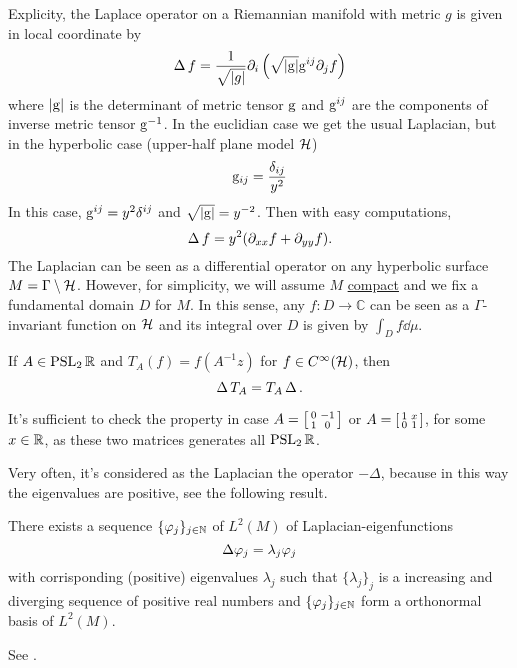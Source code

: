 Explicity, the Laplace operator on a Riemannian manifold with metric $g$ is given in local coordinate by
\[
\operatorname{\Delta} f = \frac{1}{\sqrt{\left| g\right|}}\partial_{i}\left(\sqrt{\left| \mathrm{g}\right|}\mathrm{g}^{ij}\partial_{j}f\right)
\]
where $\left| \mathrm{g}\right|$ is the determinant of metric tensor $\mathrm{g}$ and $\mathrm{g}^{ij}$ are the components of inverse metric tensor $\mathrm{g}^{-1}$. In the euclidian case we get the usual Laplacian, but in the hyperbolic case (upper-half plane model $\mathcal{H}$)
\[
\mathrm{g}_{ij}=\frac{\delta_{ij}}{y^{2}}
\]
In this case, $\mathrm{g}^{ij}=y^{2}\delta^{ij}$ and $\sqrt{\left| \mathrm{g}\right|}=y^{-2}$. Then with easy computations,
\[
\operatorname{\Delta} f=y^{2}(\partial_{xx}f+\partial_{yy}f).
\]
The Laplacian can be seen as a differential operator on any hyperbolic surface $M=\Gamma\setminus\mathcal{H}$. However, for simplicity, we will assume $M$ \underline{compact} and we fix a fundamental domain $D$ for $M$. In this sense, any $f\colon D\to\mathbb{C}$ can be seen as a $\Gamma$-invariant function on $\mathcal{H}$ and its integral over $D$ is given by $\int_{D}f\dd\mu$.

\begin{nlem}
If $A\in\operatorname{PSL}_{2}\mathbb{R}$ and $T_{A}(f)=f(A^{-1}z)$ for $f\in C^{\infty}(\mathcal{H})$, then 
\[
\operatorname{\Delta} T_{A}=T_{A}\operatorname{\Delta}.
\]
\end{nlem}
\begin{prf}
It's sufficient to check the property in case $A=\left[\begin{smallmatrix} 0&-1\\1&0 \end{smallmatrix}\right]$ or $A=\left[\begin{smallmatrix} 1&x\\0&1 \end{smallmatrix}\right]$, for some $x\in\mathbb{R}$, as these two matrices generates all $\operatorname{PSL}_{2}\mathbb{R}$.
\end{prf}

\begin{remark}
Very often, it's considered as the Laplacian the operator $-\Delta$, because in this way the eigenvalues are positive, see the following result.
\end{remark}

\begin{nteo}
\label{teo:spectra_laplace}
There exists a sequence $\{\varphi_{j}\}_{j\in\mathbb{N}}$ of $L^{2}(M)$ of Laplacian-eigenfunctions
\[
\Delta\varphi_{j}=\lambda_{j}\varphi_{j}
\]
with corrisponding (positive) eigenvalues $\lambda_{j}$ such that $\{\lambda_{j}\}_{j}$ is a increasing and diverging sequence of positive real numbers and $\{\varphi_{j}\}_{j\in\mathbb{N}}$ form a orthonormal basis of $L^{2}(M)$.
\end{nteo}
\begin{prf}
See \cite{Masson:aque_everything}.
\end{prf}

